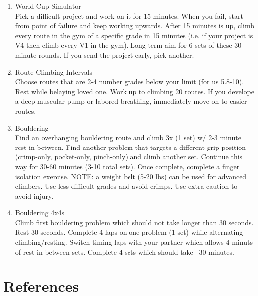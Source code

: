 \documentclass[12pt, letterpaper]{article}
\begin{document}
\begin{enumerate}

\item World Cup Simulator \\ 
Pick a difficult project and work on it for 15 minutes. When you fail, start from 
point of failure and keep working upwards. After 15 minutes is up, climb every route
 in the gym of a specific grade in 15 minutes (i.e. if your project is V4 then climb 
 every V1 in the gym). Long term aim for 6 sets of these 30 minute rounds. If you send the
 project early, pick another.

\item Route Climbing Intervals \\ 
Choose routes that are 2-4 number grades below your limit (for us 5.8-10). 
Rest while belaying loved one. Work up to climbing 20 routes. If you develope 
a deep muscular pump or labored breathing, immediately move on to easier routes.

\item Bouldering \\ 
Find an overhanging bouldering route and climb 3x (1 set) w/ 2-3 minute rest
in between. Find another problem that targets a different grip position
(crimp-only, pocket-only, pinch-only) and climb another set. 
Continue this way for 30-60 minutes (3-10 total sets).
Once complete, complete a finger isolation exercise.
NOTE: a weight belt (5-20 lbs) can be used for advanced climbers. 
Use less difficult grades and avoid crimps. Use extra caution to avoid injury.

\item Bouldering 4x4s \\ 
Climb first bouldering problem which should not take longer than 
30 seconds. Rest 30 seconds. Complete 4 laps on one problem (1 set)
while alternating climbing/resting. Switch timing laps with your partner
which allows 4 minuts of rest in between sets. Complete 4 sets which
should take ~30 minutes.

\end{enumerate}







\section{References}
\printbibliography[heading=none] 
\end{document}
